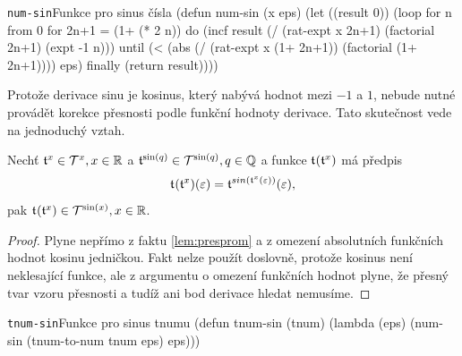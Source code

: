 \begin{lispcode}{\texttt{num-sin}}{Funkce pro sinus čísla}
(\textcolor{funkcionalni}{defun} \textcolor{pojmenovan}{num-sin} (x eps)
  (\textcolor{vedlejsi}{let} ((result 0))
    (\textcolor{funkcionalni}{loop} \textcolor{obarvi}{for} n \textcolor{obarvi}{from} 0
          \textcolor{obarvi}{for} 2n+1 = (\textcolor{matematicke}{1+} (\textcolor{matematicke}{*} 2 n))
          \textcolor{obarvi}{do} (\textcolor{vedlejsi}{incf} result
                   (\textcolor{matematicke}{/} (\textcolor{moje}{rat-expt} x 2n+1)
                      (\textcolor{moje}{factorial} 2n+1) (\textcolor{matematicke}{expt} -1 n)))
          \textcolor{obarvi}{until} (\textcolor{matematicke}{<} (\textcolor{matematicke}{abs} (\textcolor{matematicke}{/} (\textcolor{moje}{rat-expt} x (\textcolor{matematicke}{1+} 2n+1))
                           (\textcolor{moje}{factorial} (\textcolor{matematicke}{1+} 2n+1))))
                   eps)
          \textcolor{obarvi}{finally} (\textcolor{funkcionalni}{return} result))))
\end{lispcode}

Protože derivace sinu je kosinus, který nabývá hodnot mezi $-1$ a $1$, nebude nutné provádět korekce přesnosti podle funkční hodnoty derivace. Tato skutečnost vede na jednoduchý vztah.

\begin{lemma}
Nechť $\mathfrak{t}^{x}\in\mathcal{T}^{x},x\in\mathbb{R}$ a $\mathfrak{t}^{\mathrm{sin}(q)}\in\mathcal{T}^{\mathrm{sin}(q)},q\in\mathbb{Q}$ a funkce $\mathfrak{t}^{}(\mathfrak{t}^{x})$ má předpis
\begin{equation}
\mathfrak{t}^{}(\mathfrak{t}^{x})(\varepsilon)=\mathfrak{t}^{sin(\mathfrak{t}^{x}(\varepsilon))}(\varepsilon),
\end{equation}
pak $\mathfrak{t}^{}(\mathfrak{t}^{x})\in\mathcal{T}^{\mathrm{sin}(x)},x\in\mathbb{R}$.
\begin{proof}
Plyne nepřímo z faktu \ref{lem:presprom} a z omezení absolutních funkčních hodnot kosinu jedničkou. Fakt nelze použít doslovně, protože kosinus není neklesající funkce, ale z argumentu o omezení funkčních hodnot plyne, že přesný tvar vzoru přesnosti a tudíž ani bod derivace hledat nemusíme.
\end{proof}
\end{lemma}

\begin{lispcode}{\texttt{tnum-sin}}{Funkce pro sinus tnumu}
(\textcolor{funkcionalni}{defun} \textcolor{pojmenovan}{tnum-sin} (tnum)
  (\textcolor{funkcionalni}{lambda} (eps)
    (\textcolor{moje}{num-sin} (\textcolor{moje}{tnum-to-num} tnum eps) eps)))
\end{lispcode}

